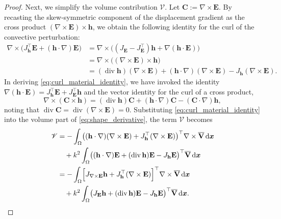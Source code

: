 \documentclass[12pt,reqno]{amsart}
\theoremstyle{definition}
\numberwithin{equation}{section}
\begin{document}
\begin{proof}
Next, we simplify the volume contribution $\mathscr V$. Let $\mathbf{C} := \nabla \times \mathbf{E}$. By recasting the skew-symmetric component of the displacement gradient as the cross product $(\nabla \times \mathbf{E}) \times \mathbf{h}$, we obtain the following identity for the curl of the convective perturbation:
\begin{equation}
\label{eq:curl_material_identity}
\begin{aligned}
\nabla \times \bigl( J_{\mathbf{h}}^{\top}\mathbf{E} + (\mathbf{h} \cdot \nabla)\mathbf{E} \bigr) 
&= \nabla \times \bigl( (J_{\mathbf{E}} - J_{\mathbf{E}}^{\top})\mathbf{h} + \nabla(\mathbf{h} \cdot \mathbf{E}) \bigr) \\
&= \nabla \times \bigl( (\nabla \times \mathbf{E}) \times \mathbf{h} \bigr) \\
&= (\operatorname{div} \mathbf{h})(\nabla \times \mathbf{E}) + (\mathbf{h} \cdot \nabla)(\nabla \times \mathbf{E}) - J_{\mathbf{h}}(\nabla \times \mathbf{E}).
\end{aligned}
\end{equation}
In deriving \eqref{eq:curl_material_identity}, we have invoked the identity $\nabla(\mathbf{h} \cdot \mathbf{E}) = J_{\mathbf{h}}^{\top}\mathbf{E} + J_{\mathbf{E}}^{\top}\mathbf{h}$ and the vector identity for the curl of a cross product,
\[
\nabla \times (\mathbf{C} \times \mathbf{h}) = (\operatorname{div} \mathbf{h})\mathbf{C} + (\mathbf{h} \cdot \nabla)\mathbf{C} - ( \mathbf{C} \cdot \nabla ) \mathbf{h},
\]
noting that $\operatorname{div} \mathbf{C} = \operatorname{div}(\nabla \times \mathbf{E}) = 0$. Substituting \eqref{eq:curl_material_identity} into the volume part of \eqref{eq:shape_derivative}, the term $\mathscr V$ becomes
\begin{align*}
\mathscr V &= -\int_\Omega \bigl( (\mathbf{h} \cdot \nabla)(\nabla \times \mathbf{E}) + J_{\mathbf{h}}^{\top} (\nabla \times \mathbf{E}) \bigr)^{\top} \nabla \times \overline{\mathbf{V}} \,\mathrm{d}\boldsymbol{x} \\
&\quad + k^2 \int_\Omega \bigl( (\mathbf{h} \cdot \nabla)\mathbf{E} + (\operatorname{div} \mathbf{h})\mathbf{E} - J_{\mathbf{h}}\mathbf{E} \bigr)^{\top} \overline{\mathbf{V}} \,\mathrm{d}\boldsymbol{x} \\
&= -\int_\Omega \Bigl[ J_{\nabla \times \mathbf{E}}\mathbf{h} + J_{\mathbf{h}}^{\top} (\nabla \times \mathbf{E}) \Bigr]^{\top} \nabla \times \overline{\mathbf{V}} \,\mathrm{d}\boldsymbol{x} \\
&\quad + k^2 \int_\Omega \bigl( J_{\mathbf{E}}\mathbf{h} + (\operatorname{div} \mathbf{h})\mathbf{E} - J_{\mathbf{h}}\mathbf{E} \bigr)^{\top} \overline{\mathbf{V}} \,\mathrm{d}\boldsymbol{x}.
\end{align*}


\end{proof}
\end{document}
